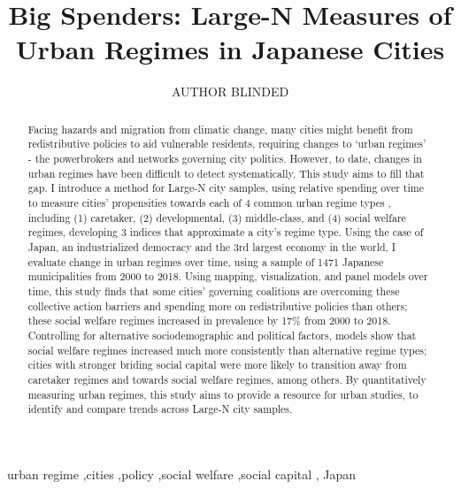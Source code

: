 \documentclass[preprint, 3p,
authoryear]{elsarticle} %
\begin{document}
\begin{frontmatter}

  \title{Big Spenders: Large-N Measures of Urban Regimes in Japanese
Cities}
    \author[UNIVERSITY BLINDED]{AUTHOR BLINDED%
  }
  
  \begin{abstract}
  Facing hazards and migration from climatic change, many cities might
  benefit from redistributive policies to aid vulnerable residents,
  requiring changes to `urban regimes' - the powerbrokers and networks
  governing city politics. However, to date, changes in urban regimes
  have been difficult to detect systematically. This study aims to fill
  that gap. I introduce a method for Large-N city samples, using
  relative spending over time to measure cities' propensities towards
  each of 4 common urban regime types \citeyearpar{stone_1993},
  including (1) caretaker, (2) developmental, (3) middle-class, and (4)
  social welfare regimes, developing 3 indices that approximate a city's
  regime type. Using the case of Japan, an industrialized democracy and
  the 3rd largest economy in the world, I evaluate change in urban
  regimes over time, using a sample of 1471 Japanese municipalities from
  2000 to 2018. Using mapping, visualization, and panel models over
  time, this study finds that some cities' governing coalitions are
  overcoming these collective action barriers and spending more on
  redistributive policies than others; these social welfare regimes
  increased in prevalence by 17\% from 2000 to 2018. Controlling for
  alternative sociodemographic and political factors, models show that
  social welfare regimes increased much more consistently than
  alternative regime types; cities with stronger briding social capital
  were more likely to transition away from caretaker regimes and towards
  social welfare regimes, among others. By quantitatively measuring
  urban regimes, this study aims to provide a resource for urban
  studies, to identify and compare trends across Large-N city samples.
  \end{abstract}
    \begin{keyword}
    urban regime \sep cities \sep policy \sep social welfare \sep social
capital \sep 
    Japan
  \end{keyword}
  
 \end{frontmatter}
\end{document}
